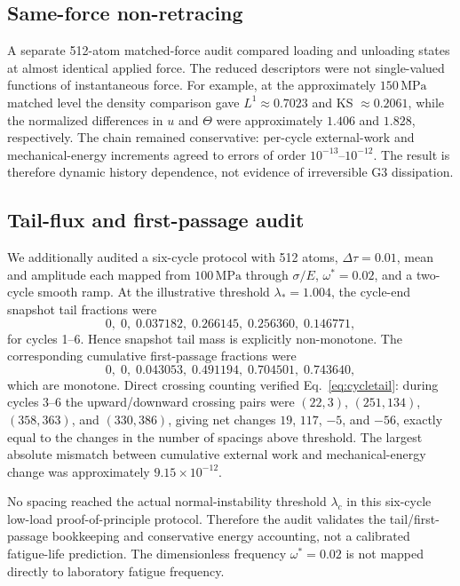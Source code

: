 \documentclass[11pt]{article}
\begin{document}
\subsection{Same-force non-retracing}
A separate 512-atom matched-force audit compared loading and unloading states at almost identical applied force. The reduced descriptors were not single-valued functions of instantaneous force. For example, at the approximately \(150\,\mathrm{MPa}\) matched level the density comparison gave \(L^1\approx0.7023\) and KS \(\approx0.2061\), while the normalized differences in \(u\) and \(\Theta\) were approximately \(1.406\) and \(1.828\), respectively. The chain remained conservative: per-cycle external-work and mechanical-energy increments agreed to errors of order \(10^{-13}\)--\(10^{-12}\). The result is therefore dynamic history dependence, not evidence of irreversible G3 dissipation.

\subsection{Tail-flux and first-passage audit}
We additionally audited a six-cycle protocol with 512 atoms, \(\Delta\tau=0.01\), mean and amplitude each mapped from \(100\,\mathrm{MPa}\) through \(\sigma/E\), \(\omega^*=0.02\), and a two-cycle smooth ramp. At the illustrative threshold \(\lambda_*=1.004\), the cycle-end snapshot tail fractions were
\begin{equation}
0,\;0,\;0.037182,\;0.266145,\;0.256360,\;0.146771,
\end{equation}
for cycles 1--6. Hence snapshot tail mass is explicitly non-monotone. The corresponding cumulative first-passage fractions were
\begin{equation}
0,\;0,\;0.043053,\;0.491194,\;0.704501,\;0.743640,
\end{equation}
which are monotone. Direct crossing counting verified Eq.~\eqref{eq:cycletail}: during cycles 3--6 the upward/downward crossing pairs were \((22,3)\), \((251,134)\), \((358,363)\), and \((330,386)\), giving net changes \(19\), \(117\), \(-5\), and \(-56\), exactly equal to the changes in the number of spacings above threshold. The largest absolute mismatch between cumulative external work and mechanical-energy change was approximately \(9.15\times10^{-12}\).

No spacing reached the actual normal-instability threshold \(\lambda_c\) in this six-cycle low-load proof-of-principle protocol. Therefore the audit validates the tail/first-passage bookkeeping and conservative energy accounting, not a calibrated fatigue-life prediction. The dimensionless frequency \(\omega^*=0.02\) is not mapped directly to laboratory fatigue frequency.
\end{document}
